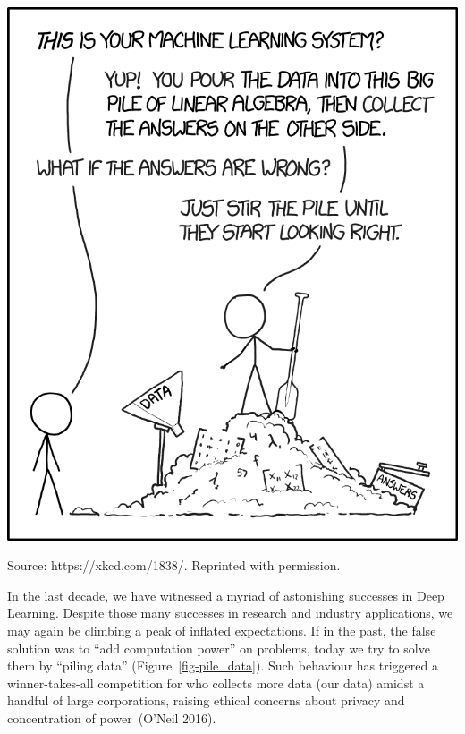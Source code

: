 \documentclass[
  letterpaper,
  12pt,
  british]{tufte-book}
\theoremstyle{plain}
\theoremstyle{plain}
\theoremstyle{definition}
\theoremstyle{remark}
\begin{document}
\begin{marginfigure}

{\centering \includegraphics{Images/machine_learning_2x.png}

}

\caption{\label{fig-pile_data}Source: https://xkcd.com/1838/. Reprinted
with permission.}

\end{marginfigure}

In the last decade, we have witnessed a myriad of astonishing successes
in Deep Learning. Despite those many successes in research and industry
applications, we may again be climbing a peak of inflated expectations.
If in the past, the false solution was to ``add computation power'' on
problems, today we try to solve them by ``piling data''
(Figure~\ref{fig-pile_data}). Such behaviour has triggered a
winner-takes-all competition for who collects more data (our data)
amidst a handful of large corporations, raising ethical concerns about
privacy and concentration of power~(O'Neil
2016).
\end{document}
